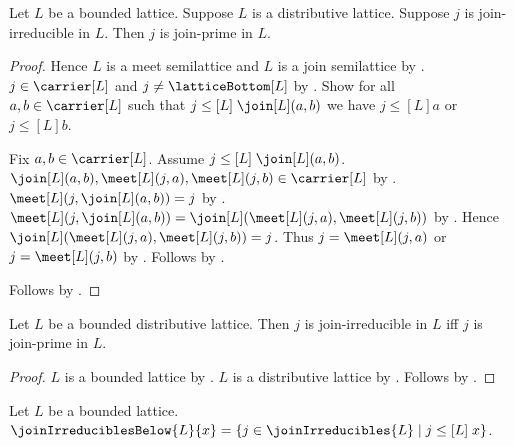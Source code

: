 \begin{theorem}\label{join_irreducible_implies_join_prime}
    Let $L$ be a bounded lattice.
    Suppose $L$ is a distributive lattice.
    Suppose $j$ is join-irreducible in $L$.
    Then $j$ is join-prime in $L$.
\end{theorem}
\begin{proof}
    Hence $L$ is a meet semilattice and $L$ is a join semilattice by
        .
    $j\in\carrier[L]$ and $j\neq\latticeBottom[L]$ by
        .
    Show for all $a,b\in\carrier[L]$ such that
        $j\mathrel{\leq[L]}\join[L](a,b)$ we have
        $j\mathrel{\leq[L]}a$ or $j\mathrel{\leq[L]}b$.
    \begin{subproof}
        Fix $a,b\in\carrier[L]$.
        Assume $j\mathrel{\leq[L]}\join[L](a,b)$.
        $\join[L](a,b),\meet[L](j,a),\meet[L](j,b)
            \in\carrier[L]$ by .
        $\meet[L](j,\join[L](a,b))=j$ by
            .
        $\meet[L](j,\join[L](a,b))
            =\join[L](\meet[L](j,a),\meet[L](j,b))$ by
            .
        Hence $\join[L](\meet[L](j,a),\meet[L](j,b))=j$.
        Thus $j=\meet[L](j,a)$ or $j=\meet[L](j,b)$ by
            .
        Follows by .
    \end{subproof}
    Follows by .
\end{proof}

\begin{theorem}\label{join_irreducible_iff_join_prime}
    Let $L$ be a bounded distributive lattice.
    Then $j$ is join-irreducible in $L$ iff $j$ is join-prime in $L$.
\end{theorem}
\begin{proof}
    $L$ is a bounded lattice by .
    $L$ is a distributive lattice by
        .
    Follows by
        .
\end{proof}

\begin{definition}\label{join_irreducibles_below}
    Let $L$ be a bounded lattice.
    $\joinIrreduciblesBelow{L}{x}
        =\{j\in\joinIrreducibles{L}\mid
            j\mathrel{\leq[L]}x\}$.
\end{definition}

